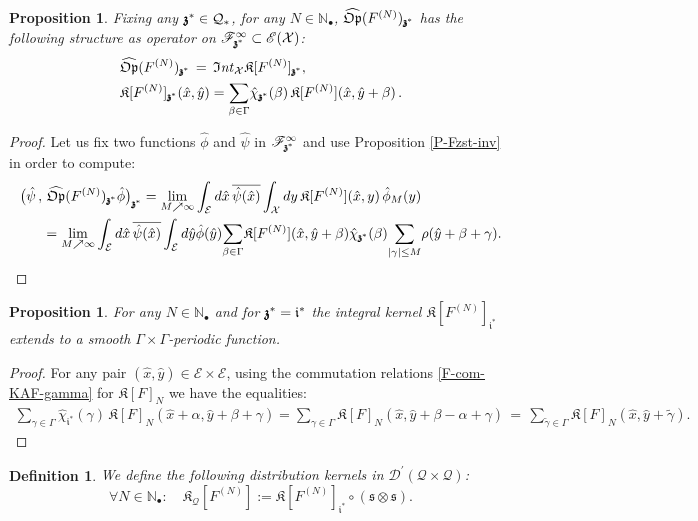 \documentclass[12pt]{article}
\newtheorem{definition}[theorem]{Definition}
\newtheorem{proposition}[theorem]{Proposition}
\theoremstyle{definition}
\def\Op{\mathfrak{Op}}
\def\X{\mathcal X}
\def\E{\mathcal E}
\def\T{\mathcal{Q}}
\def\Int{\mathfrak{I}\mathit{nt}}
\def\s{\mathfrak{s}}
\def\bz{\mathfrak{z}\hspace*{-4pt}\mathfrak{z}}
\def\tgamma{\tilde{\gamma}}
\def\Nb{\mathbb{N}_{\bullet}}
\def\beq{\begin{equation}}
\def\eeq{\end{equation}}
\numberwithin{equation}{section}
\begin{document}
\begin{proposition}\label{P-II-40}
	Fixing any $\bz^*\in\T_*$, for any $N\in\Nb$, $\widehat{\Op}(F^{(N)})_{\bz^*}$ has the following structure  as operator on $\mathscr{F}^\infty_{\bz^*}\subset\mathscr{E}(\X)$:
	\beq\label{bpm1} \begin{split}
		&\widehat{\Op}(F^{(N)})_{\bz^*}\,=\,\Int_{\X}\mathfrak{K}[F^{(N)}]_{\bz^*},\\
		&\mathfrak{K}[F^{(N)}]_{\bz^*}(\hat{x},\hat{y})=\underset{\beta\in\Gamma}{\sum}\hat{\chi}_{\bz^*}(\beta)\,\mathfrak{K}[F^{(N)}](\hat{x},\hat{y}+\beta)\,.
	\end{split}\eeq
\end{proposition}
\begin{proof}
	Let us fix two functions $\hat{\phi}$ and $\hat{\psi}$ in $\mathscr{F}^\infty_{\bz^*}$ and use Proposition \ref{P-Fzst-inv} in order to compute:
	\begin{align*}
		\big(\hat{\psi}\,,\,\widehat{\Op}(F^{(N)})_{\bz^*}\hat{\phi}\big)_{\bz^*}&=\underset{M\nearrow\infty}{\lim}\int_{\E}d\hat{x}\,\overline{\hat{\psi}(\hat{x})}\int_{\X}dy\,\mathfrak{K}[F^{(N)}](\hat{x},y)\,\hat{\phi}_M(y)\\
		&\hspace*{-2.5cm}=\underset{M\nearrow\infty}{\lim}\int_{\E}d\hat{x}\,\overline{\hat{\psi}(\hat{x})}\int_{\E}d\hat{y}\hat{\phi}(\hat{y})\underset{\beta\in\Gamma}{\sum}\mathfrak{K}[F^{(N)}](\hat{x},\hat{y}+\beta)\hat{\chi}_{\bz^*}(\beta)\underset{|\gamma|\leq{M}}{\sum}\rho(\hat{y}+\beta+\gamma).
	\end{align*}
\end{proof} 
\begin{proposition}
For any $N\in\Nb$ and for $\bz^*=\mathfrak{i}^*$ the integral kernel $\mathfrak{K}[F^{(N)}]_{\mathfrak{i}^*}$ extends to a smooth $\Gamma\times\Gamma$-periodic function.
\end{proposition}
\begin{proof}
For any pair $(\hat{x},\hat{y})\in\E\times\E$, using the commutation relations \eqref{F-com-KAF-gamma} for $\mathfrak{K}[F]_N$ we have the equalities:
\begin{align*}
\underset{\gamma\in\Gamma}{\sum}\hat{\chi}_{\mathfrak{i}^*}(\gamma)\,\mathfrak{K}[F]_N(\hat{x}+\alpha,\hat{y}+\beta+\gamma)=\underset{\gamma\in\Gamma}{\sum}\mathfrak{K}[F]_N(\hat{x},\hat{y}+\beta-\alpha+\gamma)\,=\,\underset{\tgamma\in\Gamma}{\sum}\mathfrak{K}[F]_N(\hat{x},\hat{y}+\tgamma).
\end{align*}
\end{proof}
\begin{definition}
We define the following distribution kernels in $\mathscr{D}^\prime(\T\times\T)$:
\beq
\forall{N}\in\Nb:\quad\mathfrak{K}_{\T}[F^{(N)}]:=\mathfrak{K}[F^{(N)}]_{\mathfrak{i}^*}\circ(\s\otimes\s).
\eeq
\end{definition}
\end{document}
